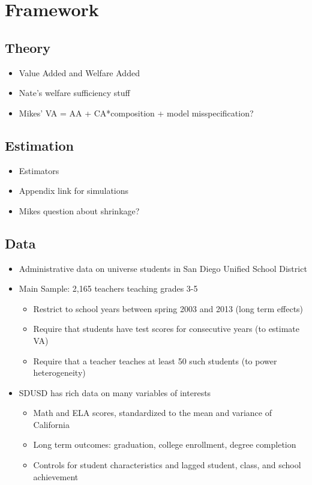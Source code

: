 \documentclass{article}
\theoremstyle{definition}
\theoremstyle{definition}
\theoremstyle{definition}
\begin{document}
\section{Framework} \label{framework}

\subsection{Theory}


\begin{itemize}
    \item Value Added and Welfare Added
    \item Nate's welfare sufficiency stuff
    \item Mikes' VA = AA + CA*composition + model misspecification?
\end{itemize}



\subsection{Estimation}
\begin{itemize}
    \item Estimators
    \item Appendix link for simulations
    \item Mikes question about shrinkage?
\end{itemize}


\subsection{Data}

\begin{itemize}
    \item Administrative data on universe students in San Diego Unified School District

    \item Main Sample: 2,165 teachers teaching grades 3-5
        
    \begin{itemize}
        \item Restrict to school years between spring 2003 and 2013 (long term effects)
        \item Require that students have test scores for consecutive years (to estimate VA)
        \item Require that a teacher teaches at least 50 such students (to power heterogeneity)
    \end{itemize}    
        
    \item SDUSD has rich data on many variables of interests
        \begin{itemize}
        \item Math and ELA scores, standardized to the mean and variance of California
        \item Long term outcomes: graduation, college enrollment, degree completion
        \item Controls for student characteristics and lagged student, class, and school achievement
    \end{itemize}  
\end{itemize}
\end{document}
